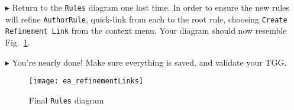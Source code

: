 \begin{itemize}
\item[$\blacktriangleright$] Return to the \texttt{Rules} diagram one last time. In order to ensure the new rules will refine \texttt{AuthorRule},
quick-link from each to the root rule, choosing \texttt{Create Refinement Link} from the context menu. Your diagram should now resemble
Fig.~\ref{ea:refinementClasses}.

\item[$\blacktriangleright$] You're nearly done! Make sure everything is saved, and validate your TGG. 

\newpage

\vspace*{2cm}

\begin{figure}[htbp]
\begin{center}
  \texttt{[image: ea\_refinementLinks]}
  \caption{Final \texttt{Rules} diagram}
  \label{ea:refinementClasses}
\end{center}
\end{figure}









\end{itemize}
